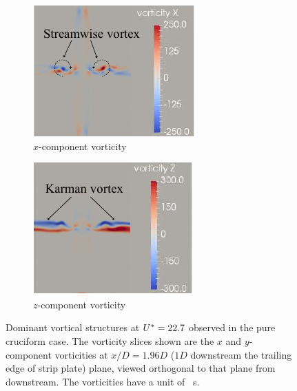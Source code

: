 \documentclass[oneside]{utmthesis}
\begin{document}
\begin{figure}
  \centering
  \begin{subfigure}[h]{0.28\textwidth}
    \includegraphics[width=\textwidth]{figs/vorx90}
    \caption{$x$-component vorticity}
    \label{fig:vorx90}
  \end{subfigure}
  \hspace{6mm}
  \begin{subfigure}[h]{0.28\textwidth}
    \includegraphics[width=\textwidth]{figs/vorz90}
    \caption{$z$-component vorticity}
    \label{fig:vorz90}
  \end{subfigure}

  \caption{Dominant vortical structures at $U^{*} = 22.7$ observed in the pure cruciform case. The vorticity slices shown are the $x$ and $y$-component vorticities at $x/D = 1.96D$ ($1D$ downstream the trailing edge of strip plate) plane, viewed orthogonal to that plane from downstream. The vorticities have a unit of \si{\per\second}.} \label{fig:vortStruct90}
\end{figure}
\end{document}
